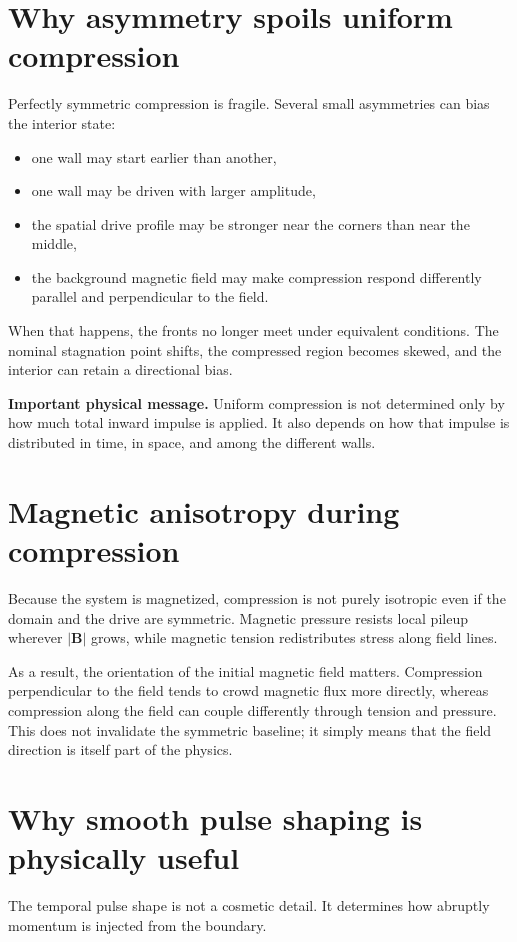 \documentclass[11pt]{article}
\begin{document}
\section{Why asymmetry spoils uniform compression}
Perfectly symmetric compression is fragile. Several small asymmetries can bias the interior state:
\begin{itemize}
    \item one wall may start earlier than another,
    \item one wall may be driven with larger amplitude,
    \item the spatial drive profile may be stronger near the corners than near the middle,
    \item the background magnetic field may make compression respond differently parallel and perpendicular to the field.
\end{itemize}

When that happens, the fronts no longer meet under equivalent conditions. The nominal stagnation point shifts, the compressed region becomes skewed, and the interior can retain a directional bias.

\begin{keybox}
\textbf{Important physical message.} Uniform compression is not determined only by how much total inward impulse is applied. It also depends on how that impulse is distributed in time, in space, and among the different walls.
\end{keybox}

\section{Magnetic anisotropy during compression}
Because the system is magnetized, compression is not purely isotropic even if the domain and the drive are symmetric. Magnetic pressure resists local pileup wherever $|\mathbf{B}|$ grows, while magnetic tension redistributes stress along field lines.

As a result, the orientation of the initial magnetic field matters. Compression perpendicular to the field tends to crowd magnetic flux more directly, whereas compression along the field can couple differently through tension and pressure. This does not invalidate the symmetric baseline; it simply means that the field direction is itself part of the physics.

\section{Why smooth pulse shaping is physically useful}
The temporal pulse shape is not a cosmetic detail. It determines how abruptly momentum is injected from the boundary.
\end{document}
